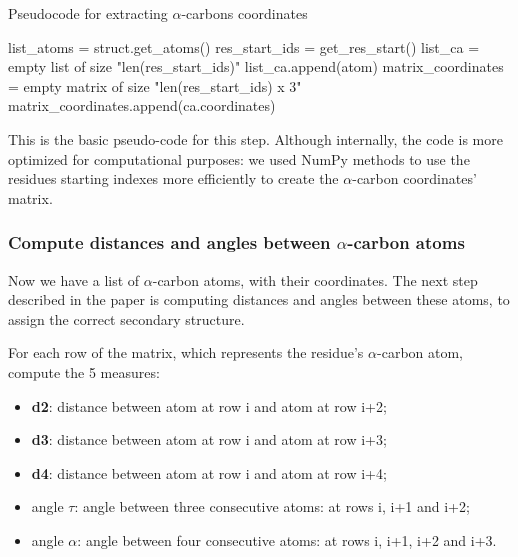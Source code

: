 \begin{algorithm}[ht]
    \caption{Pseudocode for extracting $\alpha$-carbons coordinates}\label{alg:two}
    \begin{algorithmic}
        \STATE list\_atoms = struct.get\_atoms()
        \STATE res\_start\_ids = get\_res\_start()
        \STATE list\_ca = empty list of size "len(res\_start\_ids)"
                \STATE list\_ca.append(atom)
            \ENDIF
        \ENDFOR
        \STATE matrix\_coordinates = empty matrix of size "len(res\_start\_ids) x 3"
            \STATE matrix\_coordinates.append(ca.coordinates)
        \ENDFOR
    \end{algorithmic}
\end{algorithm}

This is the basic pseudo-code for this step. Although internally, the code is more optimized for computational purposes: we used NumPy methods to use the residues starting indexes more efficiently to create the $\alpha$-carbon coordinates' matrix.

\pagebreak

\subsubsection{Compute distances and angles between $\alpha$-carbon atoms}
Now we have a list of $\alpha$-carbon atoms, with their coordinates. The next step described in the paper is computing distances and angles between these atoms, to assign the correct secondary structure.

For each row of the matrix, which represents the residue's $\alpha$-carbon atom, compute the 5 measures:
\begin{itemize}
    \item \textbf{d2}: distance between atom at row i and atom at row i+2;
    \item \textbf{d3}: distance between atom at row i and atom at row i+3;
    \item \textbf{d4}: distance between atom at row i and atom at row i+4;
    \item angle $\tau$: angle between three consecutive atoms: at rows i, i+1 and i+2;
    \item angle $\alpha$: angle between four consecutive atoms: at rows i, i+1, i+2 and i+3.
\end{itemize}

